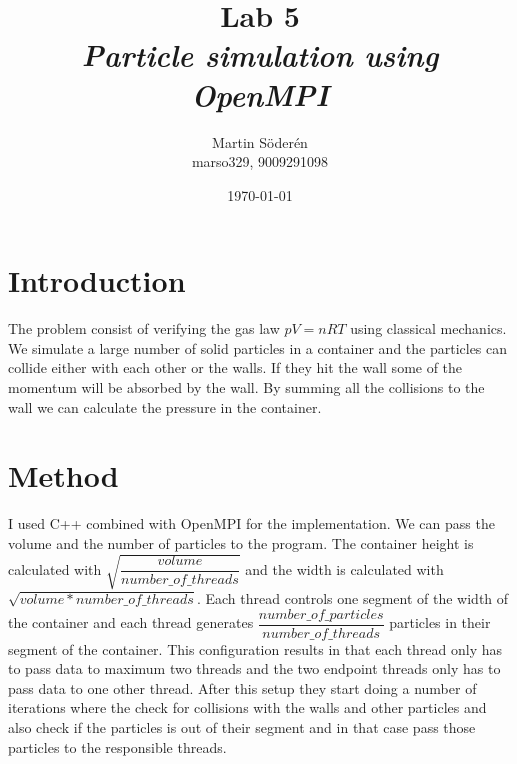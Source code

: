 \documentclass[10pt,twocolumn]{article}
\title{Lab 5\\ \emph{Particle simulation using OpenMPI}}
\author{Martin Söderén \\ marso329, 9009291098 }
\date{\today}
\begin{document}
\maketitle

\clearpage

\section{Introduction}

The problem consist of verifying the gas law $pV=nRT$ using classical mechanics. We simulate a large number of solid particles in a container and the particles can collide either with each other or the walls. If they hit the wall some of the momentum will be absorbed by the wall. By summing all the collisions to the wall we can calculate the pressure in the container. 
\section{Method}
I used C++ combined with OpenMPI for the implementation. We can pass the volume and the number of particles to the program. The container height is calculated with $\sqrt{\dfrac{volume}{number\_of\_threads}}$ and the width is calculated with $\sqrt{volume*number\_of\_threads}$. Each thread controls one segment of the width of the container and each thread generates $\dfrac{number\_of\_particles}{number\_of\_threads}$ particles in their segment of the container. This configuration results in that each thread only has to pass data to maximum two threads and the two endpoint threads only has to pass data to one other thread. After this setup they start doing a number of iterations where the check for collisions with the walls and other particles and also check if the particles is out of their segment and in that case pass those particles to the responsible threads.
\end{document}
